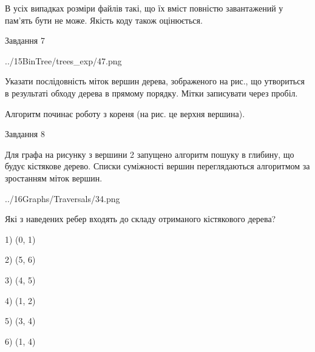 \documentclass[12pt, ukrainian]{article}
\begin{document}
{В усіх випадках розміри файлів такі, що їх вміст повністю завантажений у пам'ять бути не може. Якість коду також оцінюється.



\vspace{10mm}\par

\newpage
\begin{minipage}[t]{9.7cm}
               
{\begin{center}Завдання {7}\end{center}}
\vspace{-4mm}

\begin{center}
	{../15BinTree/trees_exp/47.png}
\end{center}
Указати послідовність міток вершин дерева, зображеного на рис., що утвориться в результаті обходу дерева в прямому порядку. Мітки записувати через пробіл.\par Алгоритм починає роботу з кореня (на рис. це верхня вершина).\par

\end{minipage}
\vline \hspace{8mm}
\begin{minipage}[t]{8.0cm}
               
{\begin{center}Завдання {8}\end{center}}
\vspace{-4mm}
Для графа на рисунку з вершини 2 запущено алгоритм пошуку в глибину, що будує кістякове дерево. Списки суміжності вершин переглядаються алгоритмом за зростанням міток вершин.\par
\begin{center}
	{../16Graphs/Traversals/34.png}
\end{center}
\par Які з наведених ребер входять до складу отриманого кістякового дерева?\par
1) (0, 1)\par
2) (5, 6)\par
3) (4, 5)\par
4) (1, 2)\par
5) (3, 4)\par
6) (1, 4)\par
{\vskip 15pt} \par


\end{minipage}}
\end{document}
